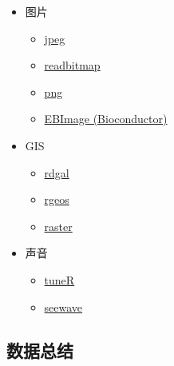 \documentclass[]{book}
\providecommand{\tightlist}{%
  \setlength{\itemsep}{0pt}\setlength{\parskip}{0pt}}
\begin{document}
\begin{itemize}
\tightlist
\item
  图片

  \begin{itemize}
  \tightlist
  \item
    \href{http://cran.r-project.org/web/packages/jpeg/index.html}{jpeg}
  \item
    \href{http://cran.r-project.org/web/packages/readbitmap/index.html}{readbitmap}
  \item
    \href{http://cran.r-project.org/web/packages/png/index.html}{png}
  \item
    \href{http://www.bioconductor.org/packages/2.13/bioc/html/EBImage.html}{EBImage (Bioconductor)}
  \end{itemize}
\item
  GIS

  \begin{itemize}
  \tightlist
  \item
    \href{http://cran.r-project.org/web/packages/rgdal/index.html}{rdgal}
  \item
    \href{http://cran.r-project.org/web/packages/rgeos/index.html}{rgeos}
  \item
    \href{http://cran.r-project.org/web/packages/raster/index.html}{raster}
  \end{itemize}
\item
  声音

  \begin{itemize}
  \tightlist
  \item
    \href{http://cran.r-project.org/web/packages/tuneR/}{tuneR}
  \item
    \href{http://rug.mnhn.fr/seewave/}{seewave}
  \end{itemize}
\end{itemize}

\hypertarget{ux6570ux636eux603bux7ed3}{%
\subsection{数据总结}\label{ux6570ux636eux603bux7ed3}}
\end{document}
